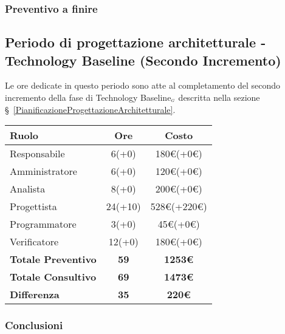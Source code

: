 {{{{\subsubsection{Preventivo a finire}

\subsection{Periodo di progettazione architetturale - Technology Baseline (Secondo Incremento)}\label{ConsuntivoPeriodoDiProgettazioneArchitetturaleTechnologyBaselineSecondoIncremento}

Le ore dedicate in questo periodo sono atte al completamento del secondo incremento della fase di Technology Baseline$_{\scaleto{G}{3pt}}$ descritta nella sezione \S~\ref{PianificazioneProgettazioneArchitetturale}.

\quad
\def\tabularxcolumn#1{m{#1}}
{
	\begin{center}
		\renewcommand{\arraystretch}{1.4}
		\begin{tabularx}{10cm}{|X|c|c|}
			\hline
			\rowcolor{airforceblue}
			\textbf{Ruolo} & \textbf{Ore} & \textbf{Costo}\\
			\hline
			Responsabile & 6(+0) & 180\euro(+0\euro)\\
			\hline
			Amministratore & 6(+0) & 120\euro(+0\euro)\\
			\hline
			Analista & 8(+0) & 200\euro(+0\euro)\\
			\hline
			Progettista & 24(+10) & 528\euro(+220\euro)\\
			\hline
			Programmatore & 3(+0) & 45\euro(+0\euro)\\
			\hline
			Verificatore & 12(+0) & 180\euro(+0\euro)\\
			\hline
			\textbf{Totale Preventivo} & \textbf{59} & \textbf{1253\euro}\\
			\hline
			\textbf{Totale Consultivo} & \textbf{69} & \textbf{1473\euro}\\
			\hline
			\textbf{Differenza} & \textbf{35} & \textbf{220\euro}
		\end{tabularx}
	\end{center}

\subsubsection{Conclusioni}

}}}}}
